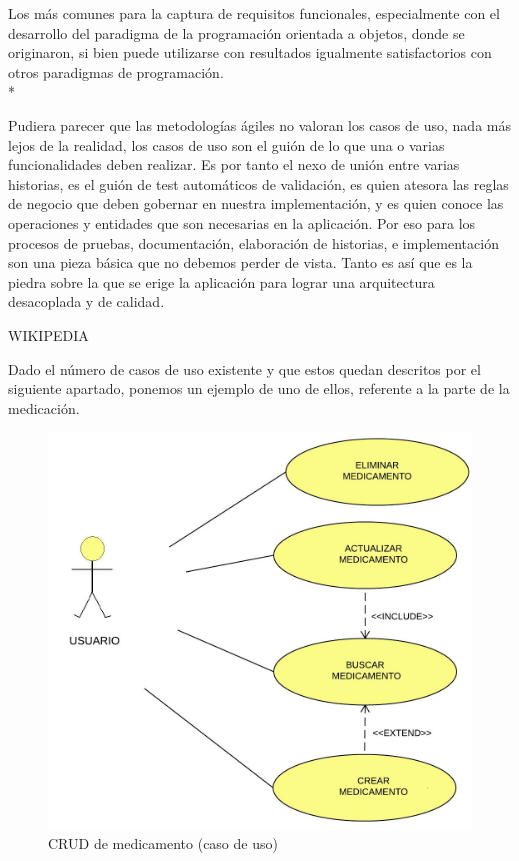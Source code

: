 \documentclass[../pfc.tex]{subfiles}
\begin{document}
	Los más comunes para la captura de requisitos funcionales, especialmente con el desarrollo del paradigma de la programación orientada a objetos, donde se originaron, si bien puede utilizarse con resultados igualmente satisfactorios con otros paradigmas de programación.\\*
	
	Pudiera parecer que las metodologías ágiles no valoran los casos de uso, nada más lejos de la realidad, los casos de uso son el guión de lo que una o varias funcionalidades deben realizar. Es por tanto el nexo de unión entre varias historias, es el guión de test automáticos de validación, es quien atesora las reglas de negocio que deben gobernar en nuestra implementación, y es quien conoce las operaciones y entidades que son necesarias en la aplicación. Por eso para los procesos de pruebas, documentación, elaboración de historias, e implementación son una pieza básica que no debemos perder de vista. Tanto es así que es la piedra sobre la que se erige la aplicación para lograr una arquitectura desacoplada y de calidad. 
	
	WIKIPEDIA
	
	Dado el número de casos de uso existente y que estos quedan descritos por el siguiente apartado, ponemos un ejemplo de uno de ellos, referente a la parte de la medicación.
	
	\begin{figure}[H]
		\centering
		\includegraphics[width=0.7\linewidth]{../images/casodeuso}
		\caption{CRUD de medicamento (caso de uso)}
		\label{fig:casodeusocrud}
	\end{figure}
	
	 
	
	\clearpage
\end{document}
